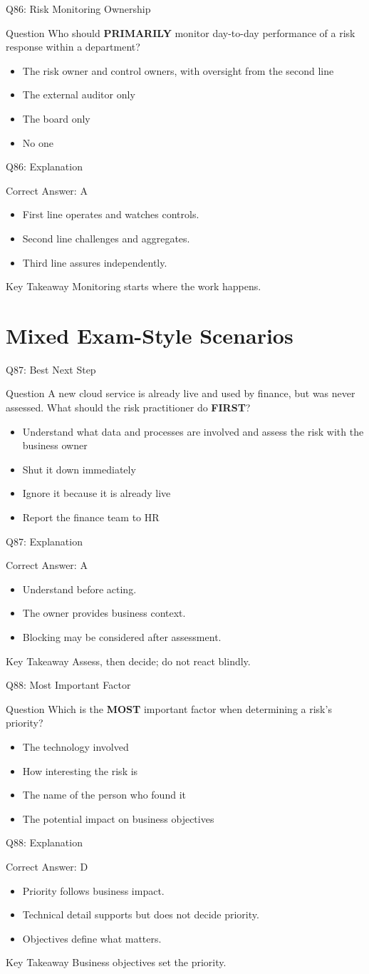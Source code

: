 \documentclass[aspectratio=169]{beamer}
\newcommand{\hq}[7]{%
	\begin{frame}{Q#1: #2}
		\begin{block}{Question}
			#3
		\end{block}
		\begin{itemize}
			#4
		\end{itemize}
	\end{frame}
	\begin{frame}{Q#1: Explanation}
		\begin{block}{Correct Answer: #5}
			\begin{itemize}
				#6
			\end{itemize}
		\end{block}
		\begin{alertblock}{Key Takeaway}
			#7
		\end{alertblock}
	\end{frame}
}
\begin{document}
	\hq{86}{Risk Monitoring Ownership}
	{Who should \textbf{PRIMARILY} monitor day-to-day performance of a risk response within a department?}
	{\item[\textbf{(A)}] The risk owner and control owners, with oversight from the second line
		\item[\textbf{(B)}] The external auditor only
		\item[\textbf{(C)}] The board only
		\item[\textbf{(D)}] No one}
	{A}
	{\item First line operates and watches controls.
		\item Second line challenges and aggregates.
		\item Third line assures independently.}
	{Monitoring starts where the work happens.}
	
	\section{Mixed Exam-Style Scenarios}
	
	\hq{87}{Best Next Step}
	{A new cloud service is already live and used by finance, but was never assessed. What should the risk practitioner do \textbf{FIRST}?}
	{\item[\textbf{(A)}] Understand what data and processes are involved and assess the risk with the business owner
		\item[\textbf{(B)}] Shut it down immediately
		\item[\textbf{(C)}] Ignore it because it is already live
		\item[\textbf{(D)}] Report the finance team to HR}
	{A}
	{\item Understand before acting.
		\item The owner provides business context.
		\item Blocking may be considered after assessment.}
	{Assess, then decide; do not react blindly.}
	
	\hq{88}{Most Important Factor}
	{Which is the \textbf{MOST} important factor when determining a risk's priority?}
	{\item[\textbf{(A)}] The technology involved
		\item[\textbf{(B)}] How interesting the risk is
		\item[\textbf{(C)}] The name of the person who found it
		\item[\textbf{(D)}] The potential impact on business objectives}
	{D}
	{\item Priority follows business impact.
		\item Technical detail supports but does not decide priority.
		\item Objectives define what matters.}
	{Business objectives set the priority.}
	
\end{document}

